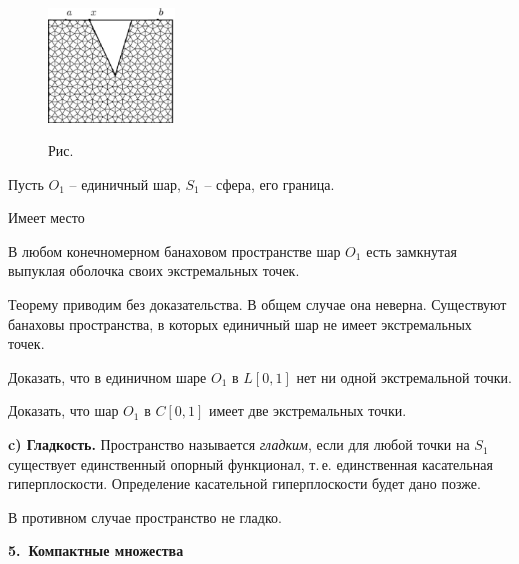    \vspace{10mm}
\begin{figure}[ht]
\begin{center}
\includegraphics[width=0.3\textwidth]{pict/pict08-4.eps}
\end{center}
 \bigskip
 \label{r8-4}

 \centerline{Рис.~\theris}
 \bigskip
\end{figure}

\vspace{5mm}



 Пусть $O_1$ -- единичный шар, $S_1$ -- сфера, его граница.

 {Имеет место}
 \begin{teo}
 В любом конечномерном банаховом пространстве шар $O_1$ есть
 замкнутая выпуклая оболочка своих экстремальных точек.
 \end{teo}

 Теорему приводим без доказательства. В общем случае она неверна. Существуют банаховы
 пространства, в которых единичный шар не имеет
 экстремальных точек.

 \ex
 Доказать, что в единичном шаре $O_1$  в $L{[0,1]}$ нет ни
 одной  экстремальной точки.

 \ex
 Доказать, что шар $O_1$ в $C[0,1]$ имеет две экстремальных точки.

\vspace{5mm}
 {\bf \normalsize c) Гладкость.}
 Пространство называется {\it гладким}, если для любой
 точки на $S_1$ существует единственный опорный функционал,
 т.\,е. единственная касательная гиперплоскости.
 Определение касательной гиперплоскости будет дано позже.

 В противном случае пространство не гладко.

\vspace{5mm}
 {\bf 5.~Компактные множества}
 \vspace{5mm}

